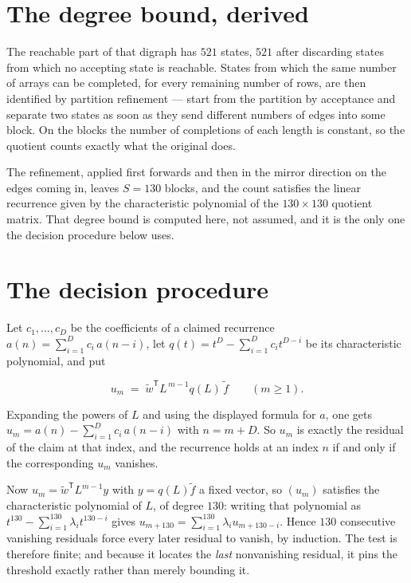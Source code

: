 \documentclass[11pt]{article}
\theoremstyle{definition}
\begin{document}
\section{The degree bound, derived}

The reachable part of that digraph has $521$ states, $521$ after discarding states from which no accepting state is reachable. States from which the same number of arrays can be completed, for every remaining number of rows, are then identified by partition refinement --- start from the partition by acceptance and separate two states as soon as they send different numbers of edges into some block. On the blocks the number of completions of each length is constant, so the quotient counts exactly what the original does.

The refinement, applied first forwards and then in the mirror direction on the edges coming in, leaves $S = 130$ blocks, and the count satisfies the linear recurrence given by the characteristic polynomial of the $130 \times 130$ quotient matrix. That degree bound is computed here, not assumed, and it is the only one the decision procedure below uses.

\section{The decision procedure}

Let $c_1,\dots,c_D$ be the coefficients of a claimed recurrence $a(n) = \sum_{i=1}^{D} c_i\,a(n-i)$, let $q(t) = t^{D} - \sum_{i=1}^{D} c_i t^{D-i}$ be its characteristic polynomial, and put

\[u_m \;=\; \tilde w^{\mathsf T} L^{\,m-1} q(L)\,\tilde f \qquad (m \ge 1).\]

Expanding the powers of $L$ and using the displayed formula for $a$, one gets $u_m = a(n) - \sum_{i=1}^{D} c_i\,a(n-i)$ with $n = m + D$. So $u_m$ is exactly the residual of the claim at that index, and the recurrence holds at an index $n$ if and only if the corresponding $u_m$ vanishes.

Now $u_m = \tilde w^{\mathsf T} L^{m-1} y$ with $y = q(L)\tilde f$ a fixed vector, so $(u_m)$ satisfies the characteristic polynomial of $L$, of degree $130$: writing that polynomial as $t^{130} - \sum_{i=1}^{130} \lambda_i t^{130-i}$ gives $u_{m+130} = \sum_{i=1}^{130} \lambda_i u_{m+130-i}$. Hence $130$ consecutive vanishing residuals force every later residual to vanish, by induction. The test is therefore finite; and because it locates the {\itshape last} nonvanishing residual, it pins the threshold exactly rather than merely bounding it.
\end{document}
